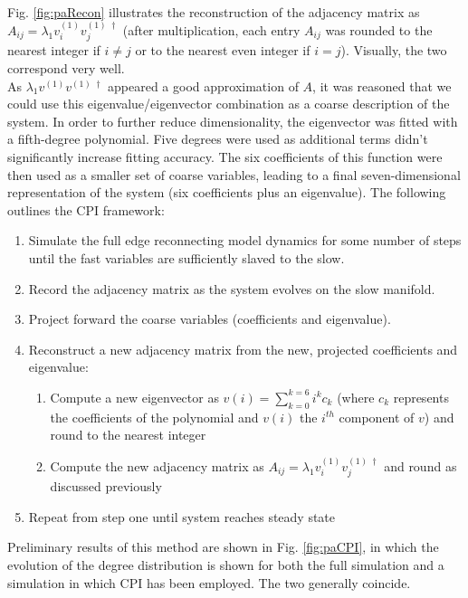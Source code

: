\documentclass[11pt]{article}
\begin{document}
\\
Fig. \ref{fig:paRecon} illustrates the reconstruction of the adjacency matrix as $A_{ij}=\lambda_{1}v^{(1)}_{i}v^{(1) \;\dagger}_{j}$ (after multiplication, each entry $A_{ij}$ was rounded to the nearest integer if $i\neq j$ or to the nearest even integer if $i=j$). Visually, the two correspond very well. \\
\indent As $\lambda_{1}v^{(1)}v^{(1) \;\dagger}$ appeared a good approximation of $A$, it was reasoned that we could use this eigenvalue/eigenvector combination as a coarse description of the system. In order to further reduce dimensionality, the eigenvector was fitted with a fifth-degree polynomial. Five degrees were used as additional terms didn't significantly increase fitting accuracy. The six coefficients of this function were then used as a smaller set of coarse variables, leading to a final seven-dimensional representation of the system (six coefficients plus an eigenvalue). The following outlines the CPI framework:
\begin{enumerate}
\item Simulate the full edge reconnecting model dynamics for some number of steps until the fast variables are sufficiently slaved to the slow.
\item Record the adjacency matrix as the system evolves on the slow manifold.
\item Project forward the coarse variables (coefficients and eigenvalue).
\item Reconstruct a new adjacency matrix from the new, projected coefficients and eigenvalue:
  \begin{enumerate}
  \item Compute a new eigenvector as $v(i) = \displaystyle\sum\limits_{k=0}^{k=6} i^{k}c_{k}$ (where $c_{k}$ represents the coefficients of the polynomial and $v(i)$ the $i^{th}$ component of $v$) and round to the nearest integer
  \item Compute the new adjacency matrix as $A_{ij}=\lambda_{1}v^{(1)}_{i}v^{(1) \;\dagger}_{j}$ and round as discussed previously
  \end{enumerate}
\item Repeat from step one until system reaches steady state
\end{enumerate}
Preliminary results of this method are shown in Fig. \ref{fig:paCPI}, in which the evolution of the degree distribution is shown for both the full simulation and a simulation in which CPI has been employed. The two generally coincide.\\
\end{document}
